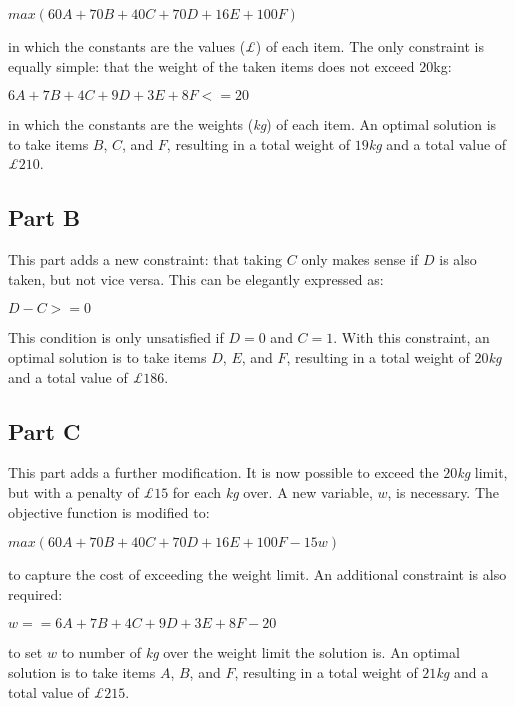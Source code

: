 \documentclass[11pt]{article} %
\begin{document}
\begin{center}

$max (60A + 70B + 40C + 70D + 16E + 100F)$

\end{center}

in which the constants are the values (\textit{£}) of each item. The only constraint is equally simple: that the weight of the taken items does not exceed $20$kg:

\begin{center}

$6A + 7B + 4C + 9D + 3E + 8F <= 20$

\end{center}

in which the constants are the weights (\textit{kg}) of each item. An optimal solution is to take items $B$, $C$, and $F$, resulting in a total weight of $19$\textit{kg} and a total value of \textit{£}$210$.

\subsection*{Part B}

This part adds a new constraint:  that taking $C$ only makes sense if $D$ is also taken, but not vice versa. This can be elegantly expressed as:

\begin{center}

$D - C >= 0$

\end{center}

This condition is only unsatisfied if $D = 0$ and $C = 1$. With this constraint, an optimal solution is to take items $D$, $E$, and $F$, resulting in a total weight of $20$\textit{kg} and a total value of \textit{£}$186$.

\subsection*{Part C}

This part adds a further modification. It is now possible to exceed the $20$\textit{kg} limit, but with a penalty of \textit{£}$15$ for each \textit{kg} over. A new variable, $w$, is necessary. The objective function is modified to:

\begin{center}

$max (60A + 70B + 40C + 70D + 16E + 100F - 15w)$

\end{center}

to capture the cost of exceeding the weight limit. An additional constraint is also required:

\begin{center}

$w == 6A + 7B + 4C + 9D + 3E + 8F - 20$

\end{center}

to set $w$ to number of \textit{kg} over the weight limit the solution is.
An optimal solution is to take items $A$, $B$, and $F$, resulting in a total weight of $21$\textit{kg} and a total value of \textit{£}$215$.
\end{document}
